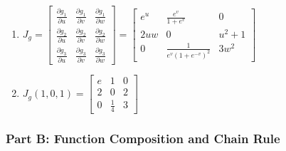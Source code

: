\documentclass[12pt]{article}
\begin{document}
\begin{enumerate}
	\item 
$J_g = \begin{bmatrix}
	\frac{\partial g_1}{\partial u} & \frac{\partial g_1}{\partial v} & \frac{\partial g_1}{\partial w} \\ 
	\frac{\partial g_2}{\partial u} & \frac{\partial g_2}{\partial v} & \frac{\partial g_2}{\partial w} \\
	\frac{\partial g_3}{\partial u} & \frac{\partial g_3}{\partial v} & \frac{\partial g_3}{\partial w} 
	\end{bmatrix} = 
	\begin{bmatrix}
	e^u & \frac{e^v}{1+e^v} & 0 \\
	2uw & 0 & u^2+1 \\
	0 & \frac{1}{e^v (1+e^{-v})^2} & 3w^2
	\end{bmatrix}$
	\item $J_g(1,0,1) = \begin{bmatrix}
	e & 1 & 0 \\
	2 & 0 & 2 \\
	0 & \frac{1}{4} & 3 
	\end{bmatrix}$
	
\end{enumerate}
\subsubsection{Part B: Function Composition and Chain Rule}
\end{document}
